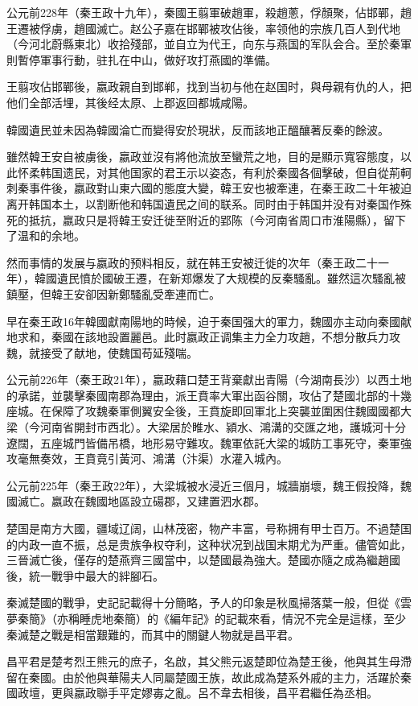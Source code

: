 公元前228年（秦王政十九年），秦國王翦軍破趙軍，殺趙蔥，俘顏聚，佔邯鄲，趙王遷被俘虜，趙國滅亡。赵公子嘉在邯鄲被攻佔後，率领他的宗族几百人到代地（今河北蔚縣東北）收拾殘部，並自立为代王，向东与燕国的军队会合。至於秦軍則暫停軍事行動，驻扎在中山，做好攻打燕國的準備。

王翦攻佔邯鄲後，嬴政親自到邯郸，找到当初与他在赵国时，與母親有仇的人，把他们全部活埋，其後经太原、上郡返回都城咸陽。

韓國遺民並未因為韓國淪亡而變得安於現狀，反而該地正醞釀著反秦的餘波。

雖然韓王安自被虜後，嬴政並沒有將他流放至蠻荒之地，目的是顯示寬容態度，以此怀柔韩国遗民，对其他国家的君王示以姿态，有利於秦國各個擊破，但自從荊軻刺秦事件後，嬴政對山東六國的態度大變，韓王安也被牽連，在秦王政二十年被迫离开韩国本土，以割断他和韩国遺民之间的联系。同时由于韩国并没有对秦国作殊死的抵抗，嬴政只是将韓王安迁徙至附近的郢陈（今河南省周口市淮陽縣），留下了温和的余地。

然而事情的发展与嬴政的预料相反，就在韩王安被迁徙的次年（秦王政二十一年），韓國遺民憤於國破王遷，在新郑爆发了大规模的反秦騷亂。雖然這次騷亂被鎮壓，但韓王安卻因新鄭騷亂受牽連而亡。

早在秦王政16年韓國獻南陽地的時候，迫于秦国强大的軍力，魏國亦主动向秦國献地求和，秦國在該地設置麗邑。此时嬴政正调集主力全力攻趙，不想分散兵力攻魏，就接受了献地，使魏国苟延殘喘。

公元前226年（秦王政21年），嬴政藉口楚王背棄獻出青陽（今湖南長沙）以西土地的承諾，並襲擊秦國南郡為理由，派王賁率大軍出函谷關，攻佔了楚國北部的十幾座城。在保障了攻魏秦軍側翼安全後，王賁旋即回軍北上突襲並圍困住魏國國都大梁（今河南省開封市西北）。大梁居於睢水、潁水、鴻溝的交匯之地，護城河十分遼闊，五座城門皆備吊橋，地形易守難攻。魏軍依託大梁的城防工事死守，秦軍強攻毫無奏效，王賁竟引黃河、鴻溝（汴渠）水灌入城內。

公元前225年（秦王政22年），大梁城被水浸近三個月，城牆崩壞，魏王假投降，魏國滅亡。嬴政在魏國地區設立碭郡，又建置泗水郡。

楚国是南方大國，疆域辽阔，山林茂密，物产丰富，号称拥有甲士百万。不過楚国的内政一直不振，总是贵族争权夺利，这种状况到战国末期尤为严重。儘管如此，三晉滅亡後，僅存的楚燕齊三國當中，以楚國最為強大。楚國亦隨之成為繼趙國後，統一戰爭中最大的絆腳石。

秦滅楚國的戰爭，史記記載得十分簡略，予人的印象是秋風掃落葉一般，但從《雲夢秦簡》（亦稱睡虎地秦簡）的《編年記》的記載來看，情況不完全是這樣，至少秦滅楚之戰是相當艱難的，而其中的關鍵人物就是昌平君。

昌平君是楚考烈王熊元的庶子，名啟，其父熊元返楚即位為楚王後，他與其生母滯留在秦國。由於他與華陽夫人同屬楚國王族，故此成為楚系外戚的主力，活躍於秦國政壇，更與嬴政聯手平定嫪毐之亂。呂不韋去相後，昌平君繼任為丞相。

